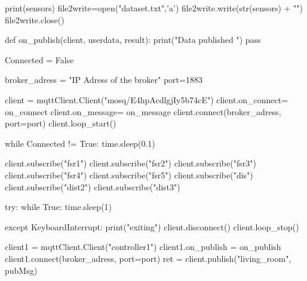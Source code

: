 \begin{python}
    print(sensors)
    file2write=open("dataset.txt",'a')
    file2write.write(str(sensors) + "\n")
    file2write.close()

def on_publish(client, userdata, result):
    print("Data published \n")
    pass

Connected = False

broker_adress = "IP Adress of the broker"
port=1883

client = mqttClient.Client("mosq/E4hpAcdlgjIy5b74cE")
client.on_connect= on_connect
client.on_message= on_message
client.connect(broker_adress, port=port)  
client.loop_start()

while Connected != True:    
    time.sleep(0.1)

client.subscribe("fsr1")
client.subscribe("fsr2")
client.subscribe("fsr3")
client.subscribe("fsr4")
client.subscribe("fsr5")
client.subscribe("dis")
client.subscribe("dist2")
client.subscribe("dist3")

try:
    while True:
        time.sleep(1)

except KeyboardInterrupt:
    print("exiting")
    client.disconnect()
    client.loop_stop()

client1 = mqttClient.Client("controller1")
client1.on_publish = on_publish
client1.connect(broker_adress, port=port)
ret = client.publish("living_room", pubMsg)
\end{python}

\newpage

